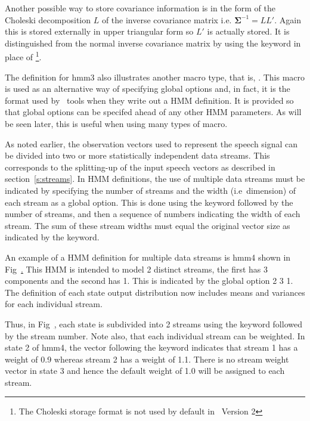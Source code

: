 Another possible way to store covariance information is in the form
of the Choleski decomposition $L$ of the 
inverse covariance matrix
i.e. $\bm{\Sigma}^{-1} = LL'$.
Again this is stored externally in upper triangular form so $L'$ is
actually stored.  It is distinguished from the normal inverse covariance
matrix by using the keyword  
in place of \footnote{
The Choleski storage format is not used by default in \HTK\ Version 2}.  


The definition for \textsf{hmm3} also illustrates another
macro type, that is, .  This macro is used as an alternative
way of specifying global options and, in fact, it is the format used
by \HTK\ tools when they write out a HMM definition.  It is provided so that global
options can be specifed ahead of any other HMM parameters.  As will
be seen later, this is useful when using many types of macro.

As noted earlier, the observation vectors used to represent
the speech signal can be divided into two or more statistically
independent data streams.  This corresponds to the splitting-up
of the input speech vectors as described in section~\ref{s:streams}.
In HMM definitions, the use of multiple data
streams must be indicated by specifying the number of streams and
the width (i.e\ dimension) of each stream as a global
option.  This is done using the keyword 
 followed
by the number of streams, and then a sequence of numbers indicating
the width of each stream.  The sum of these
stream widths must equal the original vector size as indicated
by the   keyword. 

An example of a HMM definition for multiple data 
streams
is \textsf{hmm4} shown in 
Fig~\href{f:hmm4def}.  This HMM is intended to model 2 distinct
streams, the first has 3 components and the second has 1.
This is indicated by the global option  2 3 1.
The definition of each state output distribution now
includes means and variances for each individual stream.

Thus, in Fig~\href{f:hmm4def}, each state is subdivided into
2 streams using the  keyword followed by the stream
number.  Note also, that each individual stream can be weighted.
In state 2 of \textsf{hmm4}, the vector following the
 keyword indicates that
stream 1 has a weight of 0.9 whereas
stream 2 has a weight of 1.1.  There is no stream weight
 vector
in state 3 and hence the default weight of 1.0 will be
assigned to each stream.

